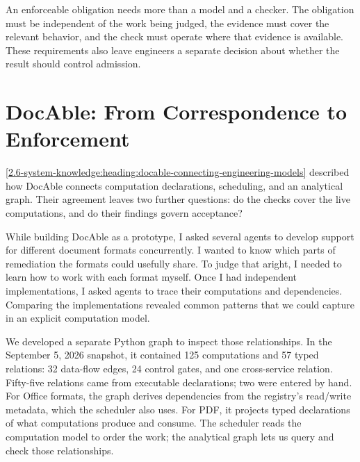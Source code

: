 An enforceable obligation needs more than a model and a checker. The obligation must be independent of the work being judged, the evidence must cover the relevant behavior, and the check must operate where that evidence is available. These requirements also leave engineers a separate decision about whether the result should control admission.



\section{DocAble: From Correspondence to Enforcement}\label{heading:docable-from-correspondence-to-enforcement}


\autoref{2.6-system-knowledge:heading:docable-connecting-engineering-models} described how DocAble connects computation declarations, scheduling, and an analytical graph. Their agreement leaves two further questions: do the checks cover the live computations, and do their findings govern acceptance?

While building DocAble as a prototype, I asked several agents to develop support for different document formats concurrently. I wanted to know which parts of remediation the formats could usefully share. To judge that aright, I needed to learn how to work with each format myself. Once I had independent implementations, I asked agents to trace their computations and dependencies. Comparing the implementations revealed common patterns that we could capture in an explicit computation model.

We developed a separate Python graph to inspect those relationships. In the September 5, 2026 snapshot, it contained 125 computations and 57 typed relations: 32 data-flow edges, 24 control gates, and one cross-service relation. Fifty-five relations came from executable declarations; two were entered by hand. For Office formats, the graph derives dependencies from the registry's read/write metadata, which the scheduler also uses. For PDF, it projects typed declarations of what computations produce and consume. The scheduler reads the computation model to order the work; the analytical graph lets us query and check those relationships.

